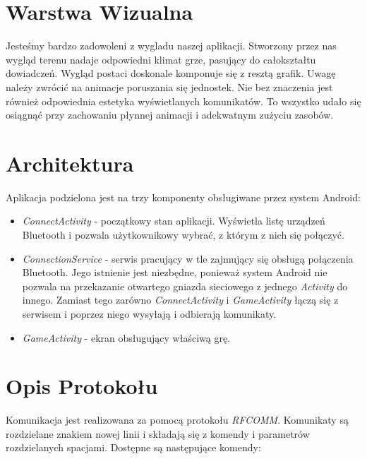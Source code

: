\documentclass[paper=a4, fontsize=11pt]{scrartcl} %
\numberwithin{equation}{section} %
\numberwithin{figure}{section} %
\numberwithin{table}{section} %
\begin{document}
\section{Warstwa Wizualna}
Jesteśmy bardzo zadowoleni z wygladu naszej aplikacji. Stworzony przez nas wygląd terenu nadaje odpowiedni klimat grze, pasujący do całokształtu dowiadczeń. Wygląd postaci doskonale komponuje się z resztą grafik. Uwagę należy zwrócić na animacje poruszania się jednostek. Nie bez znaczenia jest również odpowiednia estetyka wyświetlanych komunikatów. To wszystko udało się osiągnąć przy zachowaniu płynnej animacji i adekwatnym zużyciu zasobów.

\section{Architektura}
Aplikacja podzielona jest na trzy komponenty obsługiwane przez system Android:

\begin{itemize}

  \item \emph{ConnectActivity} - początkowy stan aplikacji. Wyświetla listę
    urządzeń Bluetooth i pozwala użytkownikowy wybrać, z którym z nich się
    połączyć.

  \item \emph{ConnectionService} - serwis pracujący w tle zajmujący się obsługą
    połączenia Bluetooth. Jego istnienie jest niezbędne, ponieważ system
    Android nie pozwala na przekazanie otwartego gniazda sieciowego z jednego
    \textit{Activity} do innego. Zamiast tego zarówno \textit{ConnectActivity}
    i \textit{GameActivity} łączą się z serwisem i poprzez niego wysyłają i
    odbierają komunikaty.

  \item \emph{GameActivity} - ekran obsługujący właściwą grę.

\end{itemize}

\section{Opis Protokołu}

Komunikacja jest realizowana za pomocą protokołu \textit{RFCOMM}.
Komunikaty są rozdzielane znakiem nowej linii i składają się z komendy i parametrów rozdzielanych spacjami.
Dostępne są następujące komendy:
\end{document}
